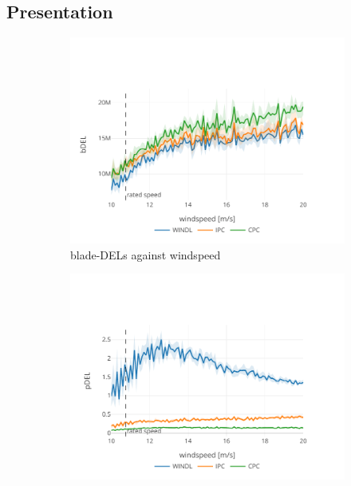 \subsection{Presentation}

\begin{figure}[hbt!]
  \centering
  \begin{subfigure}[b]{0.48\textwidth}
      \centering
      \includegraphics[width=\textwidth]{images/naive_sweep_bdel.pdf}
      \caption{blade-DELs against windspeed}
      \label{fig:naive-sweep-bdel}
  \end{subfigure}
  \begin{subfigure}[b]{0.48\textwidth}
      \centering
      \includegraphics[width=\textwidth]{images/naive_sweep_pdel.pdf}

\end{subfigure}
\end{figure}
